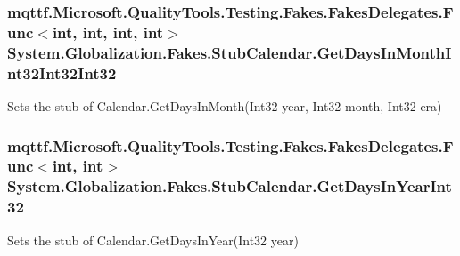 \hypertarget{class_system_1_1_globalization_1_1_fakes_1_1_stub_calendar_aa2959a9a10a5ab2f7353e8bb6c5c1acc}{
\subsubsection[{Get\-Days\-In\-Month\-Int32\-Int32\-Int32}]{\setlength{\rightskip}{0pt plus 5cm}mqttf.\-Microsoft.\-Quality\-Tools.\-Testing.\-Fakes.\-Fakes\-Delegates.\-Func$<$int, int, int, int$>$ System.\-Globalization.\-Fakes.\-Stub\-Calendar.\-Get\-Days\-In\-Month\-Int32\-Int32\-Int32}}\label{class_system_1_1_globalization_1_1_fakes_1_1_stub_calendar_aa2959a9a10a5ab2f7353e8bb6c5c1acc}


Sets the stub of Calendar.\-Get\-Days\-In\-Month(\-Int32 year, Int32 month, Int32 era)

\hypertarget{class_system_1_1_globalization_1_1_fakes_1_1_stub_calendar_af5867853a9adac853a27c94242ca072c}{
\subsubsection[{Get\-Days\-In\-Year\-Int32}]{\setlength{\rightskip}{0pt plus 5cm}mqttf.\-Microsoft.\-Quality\-Tools.\-Testing.\-Fakes.\-Fakes\-Delegates.\-Func$<$int, int$>$ System.\-Globalization.\-Fakes.\-Stub\-Calendar.\-Get\-Days\-In\-Year\-Int32}}\label{class_system_1_1_globalization_1_1_fakes_1_1_stub_calendar_af5867853a9adac853a27c94242ca072c}


Sets the stub of Calendar.\-Get\-Days\-In\-Year(\-Int32 year)

